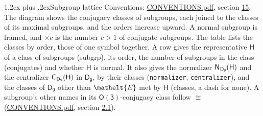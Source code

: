\documentclass[10pt,a4paper]{article}
\makeatletter
\renewcommand\section{\@startsection{section}{1}{\z@}{-3ex plus -1ex minus -.2ex}%
  {1.2ex plus .2ex}{\normalfont\large\sffamily\bfseries\color{parttitle}}}
\numberwithin{equation}{section}
\newcommand{\eltfont}[1]{{\let\sigma\eltsigma\mathelt{#1}}}
\newcommand{\grp}[1]{\mathsf{#1}}
\newcommand{\cls}[1]{\eltfont{#1}}
\newcommand{\samecls}{\cong}
\newcommand{\nconj}[1]{{\scriptsize$\times#1$}}
\newcommand{\hairsp}{\mkern1mu}
\makeatother
\begin{document}
\section{Subgroup lattice}\label{s:subgroups}
Conventions: \href{../../CONVENTIONS.pdf}{CONVENTIONS.pdf}, section \href{../../CONVENTIONS.pdf\#conv.15}{15}.
The diagram shows the conjugacy classes of subgroups, each joined to the classes of its maximal subgroups, and the orders increase upward. A normal subgroup is framed, and ${\times}c$ is the number $c > 1$ of conjugate subgroups. The table lists the classes by order, those of one symbol together. \label{n:group.H}\label{n:head.subgroup}\label{n:head.order}\label{n:head.conjugates}\label{n:head.normal}A row gives the representative $\grp{H}$ of a class of subgroups (subgrp), its order, the number of subgroups in the class (conjugates) and whether $\grp{H}$ is normal. \label{n:group.normalizer}\label{n:group.centralizer}\label{n:head.classes}It also gives the normalizer $\grp{N}_{\hairsp \grp{D_{9}}}(\grp{H})$ and the centralizer $\grp{C}_{\hairsp \grp{D_{9}}}(\grp{H})$ in $\grp{D_{9}}$, by their classes (\texttt{normalizer}, \texttt{centralizer}), and the classes of $\grp{D_{9}}$ other than $\cls{E}$ met by $\grp{H}$ (classes, a dash for none). A subgroup's other names in its \href{O3.pdf}{$\grp{O(3)}$}-conjugacy class follow $\samecls$ (\href{../../CONVENTIONS.pdf}{CONVENTIONS.pdf}, section \href{../../CONVENTIONS.pdf\#conv.2.1}{2.1}).
\begin{center}
\end{center}
\end{document}
